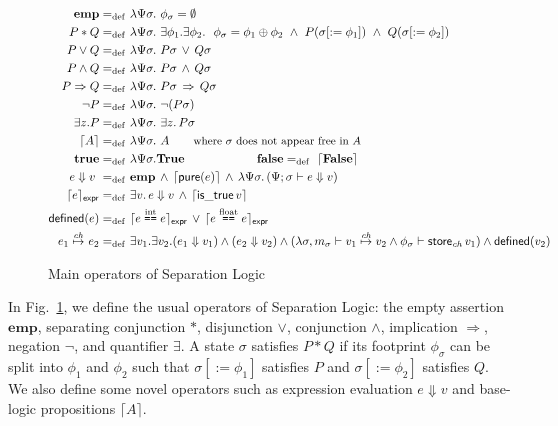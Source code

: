 \documentclass{llncs}
\newcommand{\tyface}[1]{\ensuremath{\mathsf{#1}}}
\newcommand{\fmap}{\Psi}
\newcommand{\infootprint}[4]{#4 \vdash \tyface{#3}_#2\, #1}
\newcommand{\evalexp}[3]{\fmap; #1 \vdash #2 \Downarrow #3}
\newcommand{\loadv}[4]{#1\vdash #2\stackrel{#3}{\mapsto}#4}
\newcommand{\emp}{\ensuremath{\mathrm{\mathbf{emp}}}}
\newcommand{\TT}{\ensuremath{\mathrm{\mathbf{true}}}}
\newcommand{\FF}{\ensuremath{\mathrm{\mathbf{false}}}}
\newcommand{\assertprop}[1]{\lceil #1 \rceil}
\newcommand{\assertexpr}[1]{\lceil #1 \rceil_\tyface{expr}}
\newcommand{\assertmapsto}[4][]{#2\stackrel{#3}{\mapsto}_{#1}#4}
\newcommand{\assertdef}[1]{\mathsf{defined}(#1)}
\newcommand{\ceq}[3]{#2\stackrel{#1}{\mbox{\texttt{==}}}#3}
\begin{document}
\begin{figure}
\vspace{-30pt}
\begin{align*}
\emp =_\mathrm{def}~ & \lambda\fmap\sigma.~\phi_{\sigma}=\emptyset \\
P*Q =_\mathrm{def}~ & \lambda\fmap\sigma.~
\exists \phi_1. \exists \phi_2.~~
 \phi_\sigma=\phi_1\oplus\phi_2
~\wedge~  P(\sigma[:=\phi_1])~\wedge~Q(\sigma[:=\phi_2]) \\
P\vee Q =_\mathrm{def}~ & \lambda\fmap\sigma.~P\sigma\,\vee\,Q\sigma \\
P\wedge Q =_\mathrm{def}~ & \lambda\fmap\sigma.~P\sigma\,\wedge\,Q\sigma \\
P\Rightarrow Q =_\mathrm{def}~ & \lambda\fmap\sigma.~P\sigma\,\Rightarrow\,Q\sigma \\
\neg P =_\mathrm{def}~ & \lambda\fmap\sigma.~\neg (P\sigma)\\
\exists z.P =_\mathrm{def}~ & \lambda\fmap\sigma.~\exists z.\,P\sigma \\
\assertprop{A}=_\mathrm{def}~ &\lambda\fmap\sigma.~A \qquad \mbox{\small where $\sigma$
does not appear free in $A$} \\
\TT =_\mathrm{def}~ & \lambda\fmap\sigma.\mathbf{True} \qquad \qquad \qquad
\FF =_\mathrm{def}~ \assertprop{\mathrm{\mathbf{False}}} \\
e \Downarrow v ~=_\mathrm{def}~&  \emp\,\wedge\,
\assertprop{\tyface{pure}(e)}\,\wedge\, 
 \lambda\fmap\sigma.
\,(\evalexp{\sigma}{e}{v}) \\
\assertexpr{e}=_\mathrm{def} ~& \exists v.\,e\Downarrow v\, \wedge\,
\assertprop{\tyface{is\_true}\,v} \\
\assertdef{e} =_\mathrm{def}~&
\assertexpr{\ceq{\mathrm{int}}{e}{e}}\,\vee\,
\assertexpr{\ceq{\mathrm{float}}{e}{e}} \\
\assertmapsto{e_1}{\mathit{ch}}{e_2}  =_\mathrm{def}~&
\exists v_1. \exists v_2. (e_1 \Downarrow v_1) \wedge
(e_2 \Downarrow v_2) \wedge
(\lambda \sigma, \loadv{m_\sigma}{v_1}{\mathit{ch}}{v_2} \wedge \infootprint{v_1}{\mathit{ch}}{store}{\phi_{\sigma}}) \wedge
\assertdef{v_2}
\end{align*}
\vspace{-20pt}
\caption{Main operators of Separation Logic}
\label{seplogfig}
\vspace{-10pt}
\end{figure}

In Fig.~\ref{seplogfig}, we define the usual operators of Separation Logic:
the empty assertion $\emp$, separating conjunction $*$, 
disjunction $\vee$, conjunction $\wedge$, implication $\Rightarrow$,
negation $\neg$, and quantifier $\exists$.
A state $\sigma$ satisfies $P*Q$ if its footprint $\phi_\sigma$ can be split into $\phi_1$ and $\phi_2$
such that $\sigma[:=\phi_1]$ satisfies $P$ and $\sigma[:=\phi_2]$ satisfies $Q$.
We also define some novel operators such as
expression evaluation $e\Downarrow v$
and base-logic propositions  $\assertprop{A}$.
\end{document}
